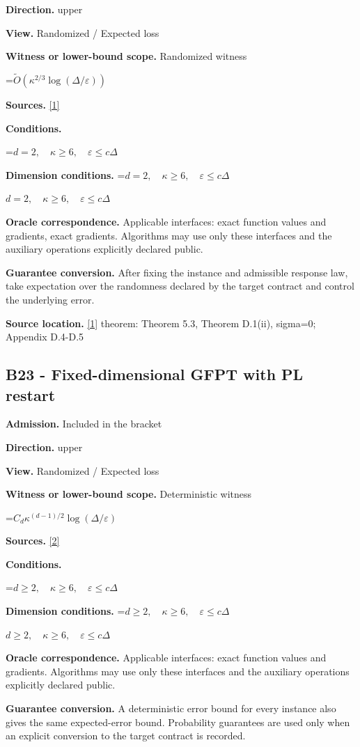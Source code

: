 \documentclass[10pt,a4paper]{article}
\newcommand{\AtlasMath}[1]{\par\begingroup\centering\setbox0=\hbox{$\displaystyle #1$}\ifdim\wd0>1.4\linewidth\typeout{ATLAS WIDE FORMULA: \the\wd0}\fi\ifdim\wd0>\linewidth\resizebox{\linewidth}{!}{\box0}\else\box0\fi\par\endgroup}
\newcommand{\AtlasInlineMath}[1]{\begingroup\setbox0=\hbox{$#1$}\ifdim\wd0>.4\linewidth\endgroup\AtlasMath{#1}\else\endgroup$#1$\fi}
\begin{document}
\textbf{Direction.} upper

\textbf{View.} Randomized / Expected loss

\textbf{Witness or lower-bound scope.} Randomized witness

\AtlasMath{\widetilde{O}(\kappa^{2/3}\log(\Delta/\varepsilon))}
\textbf{Sources.} \href{https://arxiv.org/pdf/2609.03990}{[1]}

\textbf{Conditions.} 
\AtlasMath{d=2,\quad\kappa\ge6,\quad\varepsilon\le c\Delta}


\textbf{Dimension conditions.} \AtlasInlineMath{d=2,\quad\kappa\ge6,\quad\varepsilon\le c\Delta}

\textbf{Oracle correspondence.} Applicable interfaces: exact function values and gradients, exact gradients. Algorithms may use only these interfaces and the auxiliary operations explicitly declared public.

\textbf{Guarantee conversion.} After fixing the instance and admissible response law, take expectation over the randomness declared by the target contract and control the underlying error.

\textbf{Source location.} \href{https://arxiv.org/pdf/2609.03990}{[1]} theorem: Theorem 5.3, Theorem D.1(ii), sigma=0; Appendix D.4-D.5

\subsection{B23 - Fixed-dimensional GFPT with PL restart}
\textbf{Admission.} Included in the bracket

\textbf{Direction.} upper

\textbf{View.} Randomized / Expected loss

\textbf{Witness or lower-bound scope.} Deterministic witness

\AtlasMath{C_d\kappa^{(d-1)/2}\log(\Delta/\varepsilon)}
\textbf{Sources.} \href{https://arxiv.org/pdf/2310.09157}{[2]}

\textbf{Conditions.} 
\AtlasMath{d\ge2,\quad\kappa\ge6,\quad\varepsilon\le c\Delta}


\textbf{Dimension conditions.} \AtlasInlineMath{d\ge2,\quad\kappa\ge6,\quad\varepsilon\le c\Delta}

\textbf{Oracle correspondence.} Applicable interfaces: exact function values and gradients. Algorithms may use only these interfaces and the auxiliary operations explicitly declared public.

\textbf{Guarantee conversion.} A deterministic error bound for every instance also gives the same expected-error bound. Probability guarantees are used only when an explicit conversion to the target contract is recorded.
\end{document}
